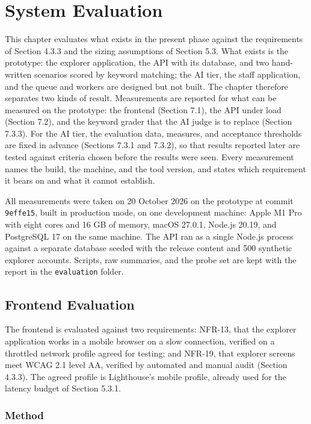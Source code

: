 \newpage
\section{System Evaluation}

This chapter evaluates what exists in the present phase against the requirements of Section 4.3.3 and the sizing assumptions of Section 5.3. What exists is the prototype: the explorer application, the API with its database, and two hand-\allowbreak{}written scenarios scored by keyword matching; the AI tier, the staff application, and the queue and workers are designed but not built. The chapter therefore separates two kinds of result. Measurements are reported for what can be measured on the prototype: the frontend (Section 7.1), the API under load (Section 7.2), and the keyword grader that the AI judge is to replace (Section 7.3.3). For the AI tier, the evaluation data, measures, and acceptance thresholds are fixed in advance (Sections 7.3.1 and 7.3.2), so that results reported later are tested against criteria chosen before the results were seen. Every measurement names the build, the machine, and the tool version, and states which requirement it bears on and what it cannot establish.

All measurements were taken on 20 October 2026 on the prototype at commit \texttt{9effe15}, built in production mode, on one development machine: Apple M1 Pro with eight cores and 16 GB of memory, macOS 27.0.1, Node.js 20.19, and PostgreSQL 17 on the same machine. The API ran as a single Node.js process against a separate database seeded with the release content and 500 synthetic explorer accounts. Scripts, raw summaries, and the probe set are kept with the report in the \texttt{evaluation} folder.

\subsection{Frontend Evaluation}

The frontend is evaluated against two requirements: NFR-13, that the explorer application works in a mobile browser on a slow connection, verified on a throttled network profile agreed for testing; and NFR-19, that explorer screens meet WCAG 2.1 level AA, verified by automated and manual audit (Section 4.3.3). The agreed profile is Lighthouse's mobile profile, already used for the latency budget of Section 5.3.1\cite{r137}.

\subsubsection{Method}

